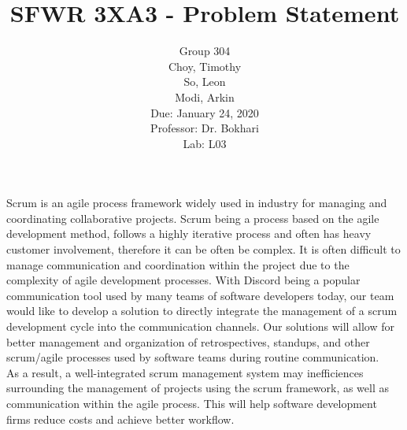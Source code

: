 \documentclass[12pt, oneside]{article}
\title{SFWR 3XA3 - Problem Statement}
\author{Group 304
		\\ Choy, Timothy
		\\ So, Leon
		\\ Modi, Arkin
		\\ Due: January 24, 2020
		\\Professor: Dr. Bokhari
		\\ Lab: L03}
\date{}
\begin{document}
\maketitle

\indent Scrum is an agile process framework widely used in industry for managing and coordinating collaborative projects. Scrum being a process based on the agile development method, follows a highly iterative process and often has heavy customer involvement, therefore it can be often be complex. It is often difficult to manage communication and coordination within the project due to the complexity of agile development processes. With Discord being a popular communication tool used by many teams of software developers today, our team would like to develop a solution to directly integrate the management of a scrum development cycle into the communication channels. Our solutions will allow for better management and organization of retrospectives, standups, and other scrum/agile processes used by software teams during routine communication.\\

\indent As a result, a well-integrated scrum management system may inefficiences surrounding the management of projects using the scrum framework, as well as communication within the agile process. This will help software development firms reduce costs and achieve better workflow. 
\end{document}
